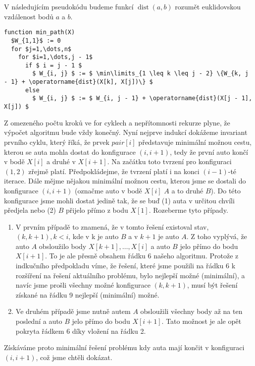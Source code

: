 \documentclass[12pt,a4paper]{article}
\theoremstyle{plain}
\newcommand\addfunctions[1]{%
  \lstset{morekeywords=[4]{#1}}}
\begin{document}
\pagestyle{fancy}                      %
\fancyhf{}                             %
\addtolength{\topmargin}{-30 pt}                   %
\setlength{\headsep}{10 pt}                      %
\renewcommand{\headrulewidth}{1 pt}                %

\addfunctions{min_path}

V následujícím pseudokódu budeme funkcí $ \operatorname{dist}(a,b) $ rozumět euklidovskou vzdálenost bodů $ a $ a $ b $.

\begin{lstlisting}[mathescape]
function min_path(X)
  $W_{1,1}$ := 0
  for $j=1,\dots,n$
    for $i=1,\dots,j - 1$
      if $ i = j - 1 $
        $ W_{i, j} $ := $ \min\limits_{1 \leq k \leq j - 2} \{W_{k, j - 1} + \operatorname{dist}(X[k], X[j])\} $
      else
        $ W_{i, j} $ := $ W_{i, j - 1} + \operatorname{dist}(X[j - 1], X[j]) $

\end{lstlisting}

Z omezeného počtu kroků ve for cyklech a nepřítomnosti rekurze plyne, že výpočet algoritmu bude vždy konečný. Nyní nejprve indukcí dokážeme invariant prvního cyklu, který říká, že prvek $ pair[i] $ představuje minimální možnou cestu, kterou se auta mohla dostat do konfigurace $ (i, i+1) $, tedy že první auto končí v bodě $ X[i] $ a druhé v $ X[i + 1] $. Na začátku toto tvrzení pro konfiguraci $ (1, 2) $ zřejmě platí. Předpokládejme, že tvrzení platí i na konci $( i - 1 )$-té iterace. Dále mějme nějakou minimální možnou cestu, kterou jsme se dostali do konfigurace $ (i, i + 1) $ (označme auto v bodě $ X[i] $ $A $ a to druhé $ B $). Do této konfigurace jsme mohli dostat jedině tak, že se buď (1) auta v určitou chvíli předjela nebo (2) $ B $ přijelo přímo z bodu $ X[1] $. Rozeberme tyto případy.

\begin{enumerate}
\item 
V prvním případě to znamená, že v tomto řešení existoval stav,  $ (k, k + 1) , k < i $, kde v k je auto $ B $ a v $ k + 1 $ je auto $ A $. Z toho vyplývá, že auto $ A $ obsloužilo body $ X[k + 1], \dots, X[i]$ a auto $ B $ jelo přímo do bodu $ X[i + 1] $. To je ale přesně obsahem řádku 6 našeho algoritmu. Protože z indkučního předpokladu víme, že řešení, které jsme použili na řádku 6 k rozšíření na řešení aktuálního problému, bylo nejlepší možné (minimální), a navíc jsme prošli všechny možné konfigurace $ (k, k + 1) $, musí být řešení získané na řádku 9 nejlepší (minimální) možné.

\item Ve druhém případě jsme nutně autem $ A $ obsloužili všechny body až na ten poslední a auto $ B $ jelo přímo do bodu $ X[i+1] $. Tato možnost je ale opět pokryta řádkem 6 díky vložení na řádku 2. 
\end{enumerate}

Získáváme proto minimální řešení problému kdy auta mají končit v konfiguraci $ (i, i+1) $, což jsme chtěli dokázat.
\end{document}
